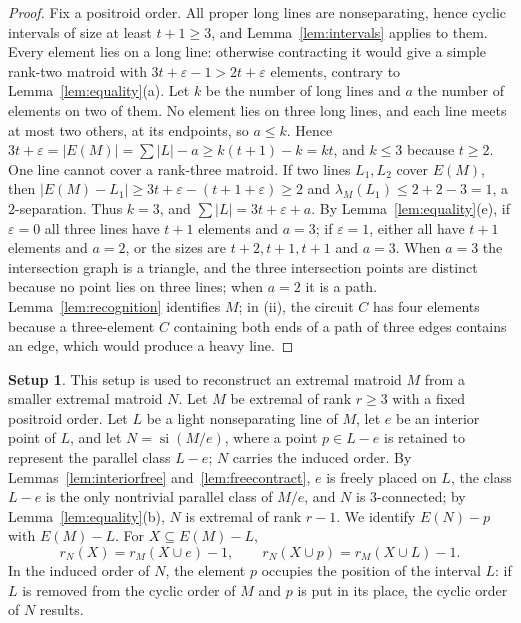 \documentclass[11pt]{amsart}
\theoremstyle{definition}
\newtheorem{setup}[theorem]{Setup}
\theoremstyle{remark}
\numberwithin{equation}{section}
\newcommand{\si}{\operatorname{si}}
\newcommand{\lam}{\lambda}
\begin{document}
\begin{proof}
Fix a positroid order. All proper long lines are nonseparating, hence cyclic intervals of size at least $t+1\ge3$, and Lemma~\ref{lem:intervals} applies to them. Every element lies on a long line: otherwise contracting it would give a simple rank-two matroid with $3t+\varepsilon-1>2t+\varepsilon$ elements, contrary to Lemma~\ref{lem:equality}(a). Let $k$ be the number of long lines and $a$ the number of elements on two of them. No element lies on three long lines, and each line meets at most two others, at its endpoints, so $a\le k$. Hence $3t+\varepsilon=|E(M)|=\sum|L|-a\ge k(t+1)-k=kt$, and $k\le3$ because $t\ge2$. One line cannot cover a rank-three matroid. If two lines $L_1,L_2$ cover $E(M)$, then $|E(M)-L_1|\ge 3t+\varepsilon-(t+1+\varepsilon)\ge 2$ and $\lam_M(L_1)\le 2+2-3=1$, a $2$-separation. Thus $k=3$, and $\sum|L|=3t+\varepsilon+a$. By Lemma~\ref{lem:equality}(e), if $\varepsilon=0$ all three lines have $t+1$ elements and $a=3$; if $\varepsilon=1$, either all have $t+1$ elements and $a=2$, or the sizes are $t+2,t+1,t+1$ and $a=3$. When $a=3$ the intersection graph is a triangle, and the three intersection points are distinct because no point lies on three lines; when $a=2$ it is a path. Lemma~\ref{lem:recognition} identifies $M$; in (ii), the circuit $C$ has four elements because a three-element $C$ containing both ends of a path of three edges contains an edge, which would produce a heavy line.
\end{proof}

\begin{setup}\label{setup}
This setup is used to reconstruct an extremal matroid $M$ from a smaller extremal matroid $N$. Let $M$ be extremal of rank $r\ge3$ with a fixed positroid order. Let $L$ be a light nonseparating line of $M$, let $e$ be an interior point of $L$, and let $N=\si(M/e)$, where a point $p\in L-e$ is retained to represent the parallel class $L-e$; $N$ carries the induced order. By Lemmas~\ref{lem:interiorfree} and~\ref{lem:freecontract}, $e$ is freely placed on $L$, the class $L-e$ is the only nontrivial parallel class of $M/e$, and $N$ is $3$-connected; by Lemma~\ref{lem:equality}(b), $N$ is extremal of rank $r-1$. We identify $E(N)-p$ with $E(M)-L$. For $X\subseteq E(M)-L$,
\begin{equation}\label{eq:rankN}
r_N(X)=r_M(X\cup e)-1,\qquad r_N(X\cup p)=r_M(X\cup L)-1.
\end{equation}
In the induced order of $N$, the element $p$ occupies the position of the interval $L$: if $L$ is removed from the cyclic order of $M$ and $p$ is put in its place, the cyclic order of $N$ results.
\end{setup}
\end{document}
